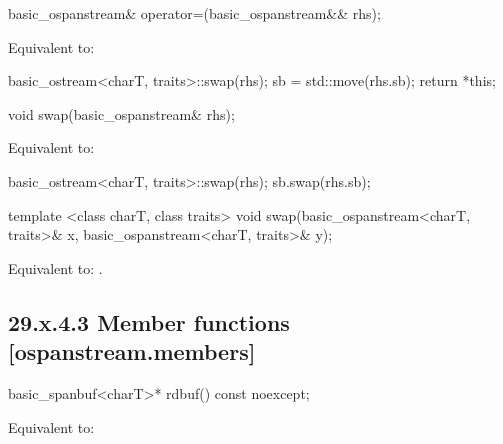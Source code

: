 \documentclass[ebook,11pt,article]{memoir}
\begin{document}
\begin{itemdecl}
basic_ospanstream& operator=(basic_ospanstream&& rhs);
\end{itemdecl}

\begin{itemdescr}
\pnum
\effects Equivalent to: 
\begin{codeblock}
    basic_ostream<charT, traits>::swap(rhs);
    sb = std::move(rhs.sb);
    return *this;
\end{codeblock}
\end{itemdescr}

\begin{itemdecl}
void swap(basic_ospanstream& rhs);
\end{itemdecl}

\begin{itemdescr}
\pnum
\effects Equivalent to:
\begin{codeblock}
    basic_ostream<charT, traits>::swap(rhs);
    sb.swap(rhs.sb);
\end{codeblock}
\end{itemdescr}


\begin{itemdecl}
template <class charT, class traits>
  void swap(basic_ospanstream<charT, traits>& x,
            basic_ospanstream<charT, traits>& y);
\end{itemdecl}

\begin{itemdescr}
\pnum
\effects Equivalent to: .
\end{itemdescr}

\subsection{29.x.4.3 Member functions [ospanstream.members]}
\label{ospanstream.members}

\begin{itemdecl}
basic_spanbuf<charT>* rdbuf() const noexcept;
\end{itemdecl}

\begin{itemdescr}
\pnum
\effects Equivalent to: \\
\end{itemdescr}
\end{document}
